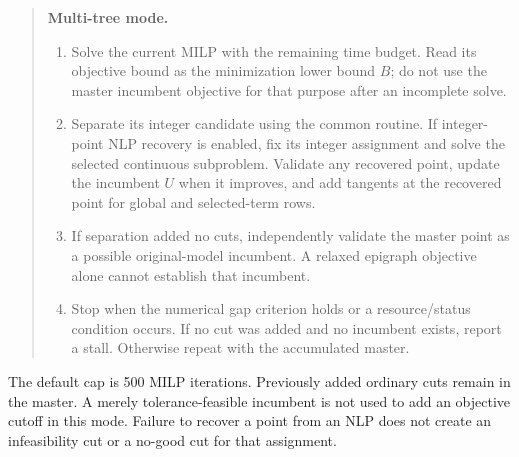 \begin{quote}
\textbf{Multi-tree mode.}
\begin{enumerate}
 \item Solve the current MILP with the remaining time budget. Read its objective bound as the minimization lower bound $B$; do not use the master incumbent objective for that purpose after an incomplete solve.
 \item Separate its integer candidate using the common routine. If integer-point NLP recovery is enabled, fix its integer assignment and solve the selected continuous subproblem. Validate any recovered point, update the incumbent $U$ when it improves, and add tangents at the recovered point for global and selected-term rows.
 \item If separation added no cuts, independently validate the master point as a possible original-model incumbent. A relaxed epigraph objective alone cannot establish that incumbent.
 \item Stop when the numerical gap criterion holds or a resource/status condition occurs. If no cut was added and no incumbent exists, report a stall. Otherwise repeat with the accumulated master.
\end{enumerate}
\end{quote}
The default cap is 500 MILP iterations. Previously added ordinary cuts remain in the master. A merely tolerance-feasible incumbent is not used to add an objective cutoff in this mode. Failure to recover a point from an NLP does not create an infeasibility cut or a no-good cut for that assignment.


